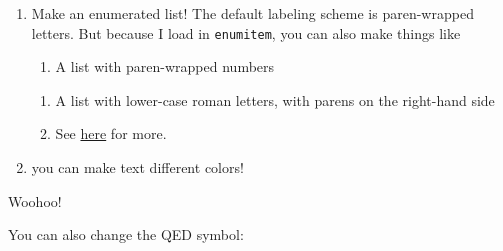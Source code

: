 \documentclass[rblock]{fkpset}
\begin{document}
  \begin{solution}
    \begin{enumerate}
      \item Make an enumerated list! The default labeling scheme is
        paren-wrapped letters. But because I load in
        \texttt{enumitem}, you can also make things like
        \begin{enumerate}[label=(\arabic*)]
          \item A list with paren-wrapped numbers
        \end{enumerate}
        \begin{enumerate}[label=\roman*)]
          \item A list with lower-case roman letters, with parens on
            the right-hand side
          \item See
            \href{https://www.overleaf.com/learn/latex/Lists}{here}
            for more.
        \end{enumerate}
      \item {\color{red} you can make text different {\color{blue}
            colors!}}
    \end{enumerate}
  \end{solution}
  \begin{solution}
    Woohoo!

    You can also change the QED symbol:
    \renewcommand{\qed}{\hfill $\triangle$}
  \end{solution}
\end{document}
